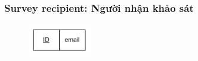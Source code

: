 \subsubsection{Survey recipient: Người nhận khảo sát}
\begin{center}
        \begin{table}[H]
                \def\arraystretch{2}%
                \caption{Thực thể Survey Recipient}
        \end{table}
\end{center}
\begin{figure}[H]
        \centering
        \includegraphics[width=0.25\textwidth]{Content/Phân tích và thiết kế hệ thống/images/ERD_mapping/survey_recipient_mapping.png}
        \label{fig:Thực thể Survey Recipient}
\end{figure}

